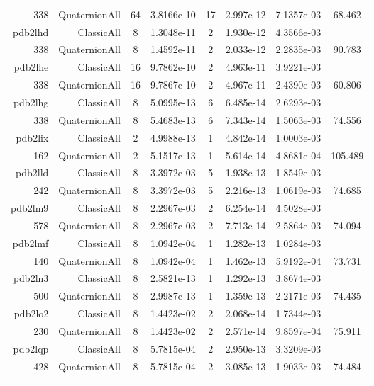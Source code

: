 \begin{xltabular}{\textwidth}{r|rcS[table-format=1.4e+2]cS[table-format=1.3e+2]S[table-format=1.4e+2]S[table-format=-1.3]}
338 & QuaternionAll & 64 & 3.8166e-10 & 17 & 2.997e-12 & 7.1357e-03 & 68.462\\  \addlinespace
pdb2lhd & ClassicAll & 8 & 1.3048e-11 & 2 & 1.930e-12 & 4.3566e-03 & \\
338 & QuaternionAll & 8 & 1.4592e-11 & 2 & 2.033e-12 & 2.2835e-03 & 90.783\\  \addlinespace
pdb2lhe & ClassicAll & 16 & 9.7862e-10 & 2 & 4.963e-11 & 3.9221e-03 & \\
338 & QuaternionAll & 16 & 9.7867e-10 & 2 & 4.967e-11 & 2.4390e-03 & 60.806\\  \addlinespace
pdb2lhg & ClassicAll & 8 & 5.0995e-13 & 6 & 6.485e-14 & 2.6293e-03 & \\
338 & QuaternionAll & 8 & 5.4683e-13 & 6 & 7.343e-14 & 1.5063e-03 & 74.556\\  \addlinespace
pdb2lix & ClassicAll & 2 & 4.9988e-13 & 1 & 4.842e-14 & 1.0003e-03 & \\
162 & QuaternionAll & 2 & 5.1517e-13 & 1 & 5.614e-14 & 4.8681e-04 & 105.489\\  \addlinespace
pdb2lld & ClassicAll & 8 & 3.3972e-03 & 5 & 1.938e-13 & 1.8549e-03 & \\
242 & QuaternionAll & 8 & 3.3972e-03 & 5 & 2.216e-13 & 1.0619e-03 & 74.685\\  \addlinespace
pdb2lm9 & ClassicAll & 8 & 2.2967e-03 & 2 & 6.254e-14 & 4.5028e-03 & \\
578 & QuaternionAll & 8 & 2.2967e-03 & 2 & 7.713e-14 & 2.5864e-03 & 74.094\\  \addlinespace
pdb2lmf & ClassicAll & 8 & 1.0942e-04 & 1 & 1.282e-13 & 1.0284e-03 & \\
140 & QuaternionAll & 8 & 1.0942e-04 & 1 & 1.462e-13 & 5.9192e-04 & 73.731\\  \addlinespace
pdb2ln3 & ClassicAll & 8 & 2.5821e-13 & 1 & 1.292e-13 & 3.8674e-03 & \\
500 & QuaternionAll & 8 & 2.9987e-13 & 1 & 1.359e-13 & 2.2171e-03 & 74.435\\  \addlinespace
pdb2lo2 & ClassicAll & 8 & 1.4423e-02 & 2 & 2.068e-14 & 1.7344e-03 & \\
230 & QuaternionAll & 8 & 1.4423e-02 & 2 & 2.571e-14 & 9.8597e-04 & 75.911\\  \addlinespace
pdb2lqp & ClassicAll & 8 & 5.7815e-04 & 2 & 2.950e-13 & 3.3209e-03 & \\
428 & QuaternionAll & 8 & 5.7815e-04 & 2 & 3.085e-13 & 1.9033e-03 & 74.484\\  \addlinespace

\end{xltabular}
